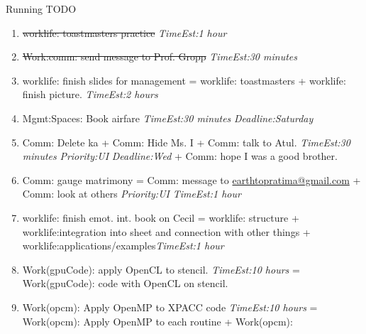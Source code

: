 \documentclass[serif, mathserif, final]{beamer}
\newcommand{\doneTask}[1]{\tiny \item \tiny \sout{#1}}
\newcommand{\te}[1]{\textit{TimeEst:}\textit{#1}}
\newcommand{\dl}[1]{\textit{Deadline:}\textit{#1}}
\newcommand{\prio}[1]{\textit{Priority:}\textit{#1}}
\newcommand{\pr}[1]{\textit{Priority:}\textit{#1}}
\begin{document}
\begin{frame}
\begin{columns}
\begin{column}{0.50\linewidth}
\begin{block}{Running TODO}
\begin{enumerate}
{        14. TODO: for right now - , since  -- for right now, since 

        15. TODO(L1:,L4, L5): I'm putting aside  
        bring that back in, seeing if I can integrate it directly into the
        application code. 

        While that is important, I've been putting in the OpenMP shared memory into
        the XPACC code. Next week, I'll put in hybrid static/dynamic
        scheduling into application code. I'm putting the OpenACC code
        on the side burner for the moment. 
}
        
         \doneTask{ worklife: toastmasters practice} \te{1 hour} 
         \doneTask{ Work:comm: send message to Prof. Gropp} \te{30 minutes} 

        \item \small worklife: finish slides for management =
          worklife: toastmasters + worklife: finish picture. \te{2
            hours} 



        \item \small Mgmt:Spaces: Book airfare \te{30 minutes}
          \dl{Saturday} 

        \item \small Comm: Delete ka + Comm: Hide Ms. I + Comm: talk
          to Atul. \te {30 minutes} \prio{UI} \dl{Wed} +  Comm: hope I
          was a good brother. 

        \item \small Comm: gauge matrimony = Comm: message to
          \href{mailto:earthtopratima@gmail.com}{earthtopratima@gmail.com} + Comm: look at others \pr{UI}
          \te{1 hour}  

        \item \small worklife: finish emot. int. book  on Cecil =
          worklife: structure + worklife:integration into sheet and
          connection with other things +
          worklife:applications/examples\te{1 hour} 
        \item \small Work(gpuCode): apply OpenCL to stencil. \te{10
          hours} =  Work(gpuCode): code with OpenCL on stencil.
        \item \small Work(opcm): Apply OpenMP to XPACC code \te{10
          hours} = Work(opcm): Apply OpenMP to each routine +
          Work(opcm): 



\end{enumerate}
\end{block}
\end{column}
\end{columns}
\end{frame}
\end{document}
